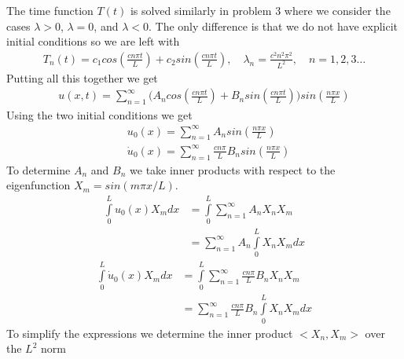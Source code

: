 \documentclass[10pt]{article}
\begin{document}
The time function $T(t)$ is solved similarly in problem 3 where we consider the cases $\lambda > 0$, $\lambda = 0$, and $\lambda < 0$. The only difference is that we do not have explicit initial conditions so we are left with 
\begin{align*}
T_n(t) = c_1cos(\frac{cn\pi t}{L}) + c_2sin(\frac{cn\pi t}{L}), \quad \lambda_n = \frac{c^2n^2\pi^2}{L^2}, \quad n = 1,2,3\ldots
\end{align*}
Putting all this together we get 
\begin{align*}
u(x,t) = \sum\limits_{n=1}^\infty \bigg(A_ncos(\frac{cn\pi t}{L}) + B_nsin(\frac{cn\pi t}{L})\bigg)sin(\frac{n\pi x}{L})
\end{align*}
Using the two initial conditions we get 
\begin{align*}
& u_0(x) = \sum\limits_{n=1}^\infty A_nsin(\frac{n\pi x}{L}) \\
& \dot{u}_0(x) = \sum\limits_{n=1}^\infty \frac{cn\pi}{L}B_nsin(\frac{n\pi x}{L})
\end{align*}
To determine $A_n$ and $B_n$ we take inner products with respect to the eigenfunction $X_m = sin(m\pi x/L)$. 
\begin{align*}
\int\limits_{0}^L u_0(x) X_m dx & = \int\limits_0^L \sum\limits_{n=1}^\infty A_nX_nX_m \\
& = \sum\limits_{n=1}^\infty A_n \int\limits_0^L X_n X_m dx
\end{align*}
\begin{align*}
\int\limits_{0}^L \dot{u}_0(x) X_m dx & = \int\limits_0^L \sum\limits_{n=1}^\infty \frac{cn\pi}{L}B_nX_nX_m \\
& = \sum\limits_{n=1}^\infty \frac{cn\pi}{L}B_n \int\limits_0^L X_n X_m dx
\end{align*}
To simplify the expressions we determine the inner product $<X_n,X_m>$ over the $L^2$ norm
\end{document}
